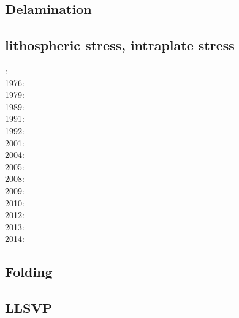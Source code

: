 \subsection*{Delamination}

\cite{gopy08}
\cite{vabv10}
\cite{vavg12}
\cite{baeg14}

\subsection*{lithospheric stress, intraplate stress}

: \cite{fouy75}\\
1976: \cite{riso76}\\
1979: \cite{riso79}\\
1989: \cite{boww89}\\
1991: \cite{worg91}\\
1992: \cite{rich92}\cite{wuvr92}\cite{zoba92}\cite{clko92}\\
2001: \cite{stsm01}\\
2004: \cite{ligu04}\\
2005: \cite{timr05}\\
2008: \cite{bilr08}\cite{ghhw08}\\
2009: \cite{ghhf09}\cite{nacl09}\\
2010: \cite{bepo10}\\
2012: \cite{nalr12}\cite{ghho12}\\
2013: \cite{ghhw13}\\
2014: \cite{vagw14}


\subsection*{Folding}

\noindent
\cite{ramb68}
\cite{ramb70}
\cite{ramb71}
\cite{flet91}
\cite{flet95}
\cite{frsc06}
\cite{schm08}
\cite{resb10}
\cite{freh11}
\cite{reds12}\cite{grsc12}
\cite{regc13}
\cite{freh14}\cite{frex14}
\cite{frsc16}

\subsection*{LLSVP}

